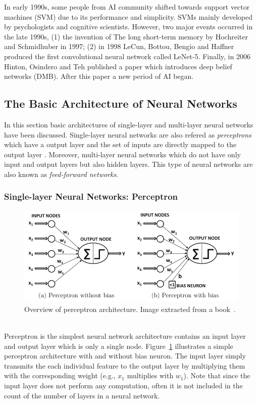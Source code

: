 In early 1990s, some people from AI community shifted towards support vector machines (SVM) due to its performance and simplicity. SVMs mainly developed by psychologists and cognitive scientists. However, two major events occurred in the late 1990s, (1) the invention of The long short-term memory by Hochreiter and Schmidhuber in 1997; (2) in 1998 LeCun, Bottou, Bengio and Haffner produced the first convolutional neural network called LeNet-5. Finally, in 2006 Hinton, Osindero and Teh published a paper which introduces deep belief networks (DMB). After this paper a new period of AI began.
\subsection{The Basic Architecture of Neural Networks} 
In this section basic architectures of single-layer and multi-layer neural networks have been discussed. Single-layer neural networks are also refered as \textit{perceptrons} which have a output layer and the set of inputs are directly mapped to the output layer%
. Moreover, multi-layer neural networks which do not have only input and output layers but also hidden layers. This type of neural networks are also known as \textit{feed-forward networks}. 
\subsubsection{Single-layer Neural Networks: Perceptron}
\begin{figure}[t]
\centering
 \includegraphics[width=\linewidth]{Figures/fig_perceptron.png}
 \caption{Overview of perceptron architecture. Image extracted from a book~\protect\cite{DBLP:books/sp/Aggarwal18}.}
 \label{fig:perceptron}
\end{figure} \\
Perceptron is the simplest neural network architecture contains an input layer and output layer which is only a single node. Figure~\ref{fig:perceptron} illustrates a simple perceptron architecture with and without bias neuron. The input layer simply transmits the each individual feature to the output layer by multiplying them with the corresponding weight (e.g., $x_1$ multiplies with $w_1$). Note that since the input layer does not perform any computation, often it is not included in the count of the number of layers in a neural network.

